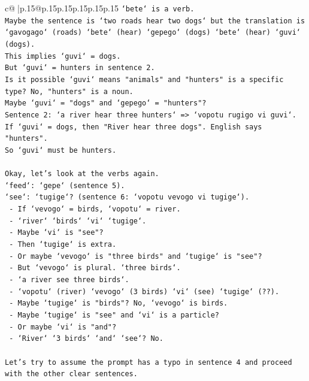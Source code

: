 \documentclass{article}
\begin{document}
{\begin{supertabular}{c@{$\;$}|p{.15\linewidth}@{}p{.15\linewidth}p{.15\linewidth}p{.15\linewidth}p{.15\linewidth}p{.15\linewidth}}
{{{\texttt{`bete` is a verb.} \\
\texttt{Maybe the sentence is `two roads hear two dogs` but the translation is `gavogago` (roads) `bete` (hear) `gepego` (dogs) `bete` (hear) `guvi` (dogs).} \\
\texttt{This implies `guvi` = dogs.} \\
\texttt{But `guvi` = hunters in sentence 2.} \\
\texttt{Is it possible `guvi` means "animals" and "hunters" is a specific type? No, "hunters" is a noun.} \\
\texttt{Maybe `guvi` = "dogs" and `gepego` = "hunters"?} \\
\texttt{Sentence 2: `a river hear three hunters` => `vopotu rugigo vi guvi`.} \\
\texttt{If `guvi` = dogs, then "River hear three dogs". English says "hunters".} \\
\texttt{So `guvi` must be hunters.} \\
\\ 
\texttt{Okay, let's look at the verbs again.} \\
\texttt{`feed`: `gepe` (sentence 5).} \\
\texttt{`see`: `tugige`? (sentence 6: `vopotu vevogo vi tugige`).} \\
\texttt{  {-} If `vevogo` = birds, `vopotu` = river.} \\
\texttt{  {-} `river` `birds` `vi` `tugige`.} \\
\texttt{  {-} Maybe `vi` is "see"?} \\
\texttt{  {-} Then `tugige` is extra.} \\
\texttt{  {-} Or maybe `vevogo` is "three birds" and `tugige` is "see"?} \\
\texttt{  {-} But `vevogo` is plural. `three birds`.} \\
\texttt{  {-} `a river see three birds`.} \\
\texttt{  {-} `vopotu` (river) `vevogo` (3 birds) `vi` (see) `tugige` (??).} \\
\texttt{  {-} Maybe `tugige` is "birds"? No, `vevogo` is birds.} \\
\texttt{  {-} Maybe `tugige` is "see" and `vi` is a particle?} \\
\texttt{  {-} Or maybe `vi` is "and"?} \\
\texttt{  {-} `River` `3 birds` `and` `see`? No.} \\
\\ 
\texttt{Let's try to assume the prompt has a typo in sentence 4 and proceed with the other clear sentences.} \\
}}}
\end{supertabular}}
\end{document}
